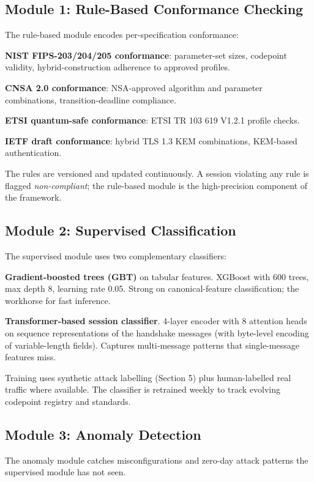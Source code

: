 \documentclass[sigconf,nonacm]{acmart}
\begin{document}
\subsection{Module 1: Rule-Based Conformance Checking}

The rule-based module encodes per-specification conformance:

\textbf{NIST FIPS-203/204/205 conformance}: parameter-set sizes,
codepoint validity, hybrid-construction adherence to approved
profiles.

\textbf{CNSA 2.0 conformance}: NSA-approved algorithm and parameter
combinations, transition-deadline compliance.

\textbf{ETSI quantum-safe conformance}: ETSI TR 103 619 V1.2.1
profile checks.

\textbf{IETF draft conformance}: hybrid TLS 1.3 KEM combinations,
KEM-based authentication.

The rules are versioned and updated continuously. A session
violating any rule is flagged \textit{non-compliant}; the rule-based
module is the high-precision component of the framework.

\subsection{Module 2: Supervised Classification}

The supervised module uses two complementary classifiers:

\textbf{Gradient-boosted trees (GBT)} on tabular features. XGBoost
with 600 trees, max depth 8, learning rate 0.05. Strong on
canonical-feature classification; the workhorse for fast inference.

\textbf{Transformer-based session classifier}. 4-layer encoder
with 8 attention heads on sequence representations of the handshake
messages (with byte-level encoding of variable-length fields).
Captures multi-message patterns that single-message features miss.

Training uses synthetic attack labelling (Section 5) plus
human-labelled real traffic where available. The classifier is
retrained weekly to track evolving codepoint registry and standards.

\subsection{Module 3: Anomaly Detection}

The anomaly module catches misconfigurations and zero-day attack
patterns the supervised module has not seen.
\end{document}
